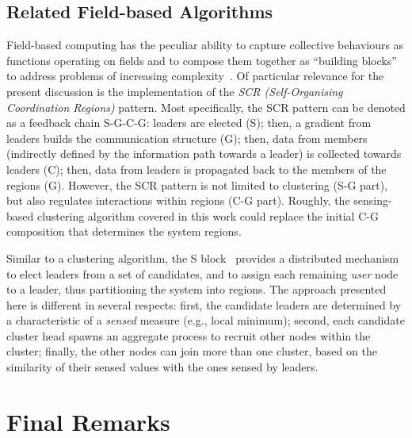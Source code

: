\subsection{Related Field-based Algorithms} %
\label{s:rw:related-ac-algorithms}
Field-based computing has the peculiar ability to capture collective behaviours as functions operating on fields
and to compose them together as ``building blocks'' to address problems of increasing complexity~\cite{DBLP:journals/jlap/ViroliBDACP19}.
%
Of particular relevance for the present discussion is the implementation of the \emph{SCR (Self-Organising Coordination Regions)} pattern.
%
Most specifically, the SCR pattern can be denoted as a feedback chain S-G-C-G: leaders are elected (S); then, a gradient from leaders builds the communication structure (G); then, data from members (indirectly defined by the information path towards a leader) is collected towards leaders (C); then, data from leaders is propagated back to the members of the regions (G).
%
However, the SCR pattern is not limited to clustering (S-G part), but also regulates interactions within regions (C-G part).
%
Roughly, the sensing-based clustering algorithm
 covered in this work could replace the initial C-G composition
 that determines the system regions.

Similar to a clustering algorithm, 
 the S block~\cite{DBLP:conf/saso/MoBD18} provides a distributed mechanism to elect leaders from a set of candidates, 
 and to assign each remaining {\em user} node to a leader, 
 thus partitioning the system into regions. 
% 
The approach presented here is different in several respects: 
%
 first, the candidate leaders are determined by a characteristic of a \emph{sensed} measure (e.g., local minimum); 
%
 second, each candidate cluster head spawns an aggregate process to recruit other nodes within the cluster; 
% 
 finally, the other nodes can join more than one cluster, 
 based on the similarity of their sensed values with the ones sensed by leaders.

\section{Final Remarks}
\label{s:conc}


